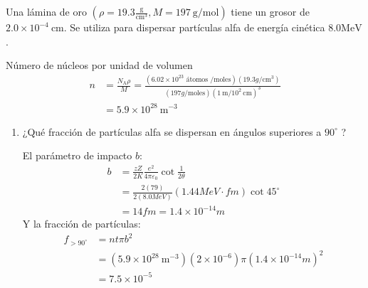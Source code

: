 \begin{problema}
    [Problema 4]  Una lámina de oro $\left(\rho=19.3 \frac{\mathrm{g}}{\mathrm{cm}^{3}}, M=197 \mathrm{~g} / \mathrm{mol}\right)$ tiene un grosor de $2.0 \times 10^{-4} \mathrm{~cm}$. Se utiliza para dispersar partículas alfa de energía cinética $8.0 \mathrm{MeV}$.
    \begin{cajita}
Número de núcleos por unidad de volumen
$$
\begin{aligned}
n &=\frac{N_{\mathrm{A}} \rho}{M}=\frac{\left(6.02 \times 10^{23} \text { átomos } / \mathrm{moles}\right)\left(19.3 g / \mathrm{cm}^3\right)}{(197 g / \mathrm{moles})\left(1 \mathrm{~m} / 10^2 \mathrm{~cm}\right)^3} \\
&=5.9 \times 10^{28} \mathrm{~m}^{-3}
\end{aligned}
$$

    \end{cajita}
    \begin{enumerate}
        \item ¿Qué fracción de partículas alfa se dispersan en ángulos superiores a $90^{\circ}$ ? 
        \begin{sol}
            El parámetro de impacto $b$: 
            \begin{align*}
                b &= \frac{zZ}{2K}\frac{e^2}{4\pi \varepsilon_0}\cot \frac{1}{2\theta}\\
                &= \frac{2(79)}{2(8.0 MeV)}(1.44 Me V\cdot fm)\cot 45^{\circ}\\
                &= 14 fm = 1.4\times 10^{-14}m
            \end{align*}
            Y la fracción de partículas: 
            \begin{align*}
                f_{>90^{\circ}} &= nt\pi b^2\\
                                &= (5.9 \times 10^{28} \mathrm{~m}^{-3})(2\times 10^{-6})\pi (1.4\times 10^{-14}m)^2\\
                                &= 7.5 \times 10^{-5}
            \end{align*}
            
        \end{sol}
        

\end{enumerate}
\end{problema}
